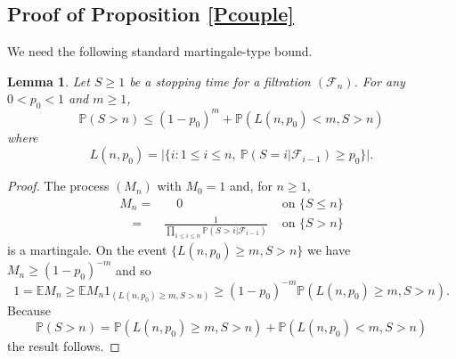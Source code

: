 \documentclass[12pt]{article}
\newtheorem{Lemma}{Lemma}
\newcommand{\FF}{\mbox{${\mathcal F}$}}
\newcommand{\Ex}{{\mathbb E}}
\renewcommand{\Pr}{{\mathbb P}}
\newcommand{\indic}{1}
\begin{document}
\subsection{Proof of Proposition \ref{Pcouple}}
\label{sec:ppcouple}
We need the following standard martingale-type bound. 
\begin{Lemma}
\label{L:SF}
Let $S \ge 1$ be a stopping time for a filtration $(\FF_n)$.  
For any $0<p_0<1$ and $m \ge 1$,
\[ \Pr(S > n) \le (1-p_0)^m + \Pr( L(n,p_0) < m, S > n) \]
where
\[ L(n,p_0) = \vert \{i: 1 \le i \le n, \ \Pr(S=i|\FF_{i-1})  \ge p_0 \} \vert .\]
\end{Lemma}
\begin{proof}
The process $(M_n)$ with $M_0 = 1$ and, for $n \ge 1$,
\begin{eqnarray*}
M_n =  & \quad 0 & \mbox{ on } \{S \le n\} \\
\quad = & \frac{1}{\prod_{1 \le i \le n} \Pr(S > i|\FF_{i-1})} &  \mbox{ on } \{S > n\}
\end{eqnarray*}
is a martingale.  On the event 
$\{  L(n,p_0) \ge m, S > n \}$ we have $M_n \ge (1-p_0)^{-m}$
and so
\[ 1 = \Ex M_n \ge \Ex M_n \indic_{(L(n,p_0) \ge m, S > n)} 
\ge (1-p_0)^{-m} \Pr( L(n,p_0) \ge m, S > n) .\] 
Because 
\[ \Pr(S > n)  =  \Pr( L(n,p_0) \ge m, S > n) +  \Pr( L(n,p_0) < m, S > n) \]
the result follows.
\end{proof}
\end{document}
